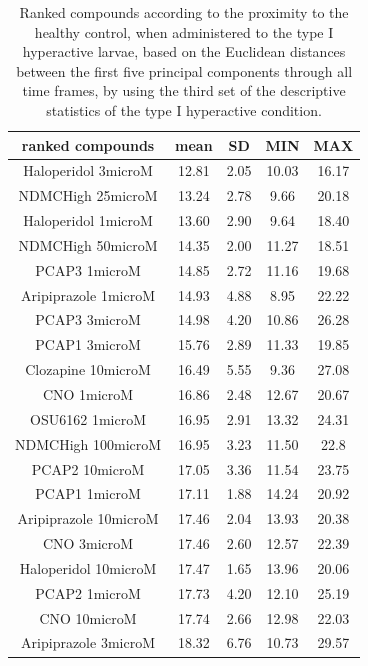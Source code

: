 \documentclass[a4paper,12pt]{article}
\begin{document}
\begin{table}[h!]\tiny
\centering
\caption{Ranked compounds according to the proximity to the healthy control, when administered to the type I hyperactive larvae, based on the Euclidean distances between the first five principal components through all time frames, by using the third set of the descriptive statistics of the type I hyperactive condition.}
\begin{tabular}{|c|c|c|c|c|}
\hline
ranked compounds             & mean & SD   & MIN  & MAX   \\ \hline
Haloperidol 3microM   & 12.81 & 2.05  & 10.03 & 16.17 \\ \hline
NDMCHigh 25microM     & 13.24 & 2.78  & 9.66  & 20.18 \\ \hline
Haloperidol 1microM   & 13.60  & 2.90   & 9.64  & 18.40  \\ \hline
NDMCHigh 50microM     & 14.35 & 2.00     & 11.27 & 18.51 \\ \hline
PCAP3 1microM       & 14.85 & 2.72  & 11.16 & 19.68 \\ \hline
Aripiprazole 1microM  & 14.93 & 4.88  & 8.95  & 22.22 \\ \hline
PCAP3 3microM       & 14.98 & 4.20   & 10.86 & 26.28 \\ \hline
PCAP1 3microM         & 15.76 & 2.89  & 11.33 & 19.85 \\ \hline
Clozapine 10microM    & 16.49 & 5.55  & 9.36  & 27.08 \\ \hline
CNO 1microM           & 16.86 & 2.48  & 12.67 & 20.67 \\ \hline
OSU6162 1microM       & 16.95 & 2.91  & 13.32 & 24.31 \\ \hline
NDMCHigh 100microM    & 16.95 & 3.23  & 11.50  & 22.8  \\ \hline
PCAP2 10microM        & 17.05 & 3.36  & 11.54 & 23.75 \\ \hline
PCAP1 1microM         & 17.11 & 1.88  & 14.24 & 20.92 \\ \hline
Aripiprazole 10microM & 17.46 & 2.04  & 13.93 & 20.38 \\ \hline
CNO 3microM           & 17.46 & 2.60   & 12.57 & 22.39 \\ \hline
Haloperidol 10microM  & 17.47 & 1.65  & 13.96 & 20.06 \\ \hline
PCAP2 1microM         & 17.73 & 4.20   & 12.10  & 25.19 \\ \hline
CNO 10microM          & 17.74 & 2.66  & 12.98 & 22.03 \\ \hline
Aripiprazole 3microM  & 18.32 & 6.76  & 10.73 & 29.57 \\ \hline

\end{tabular}
\end{table}
\end{document}
